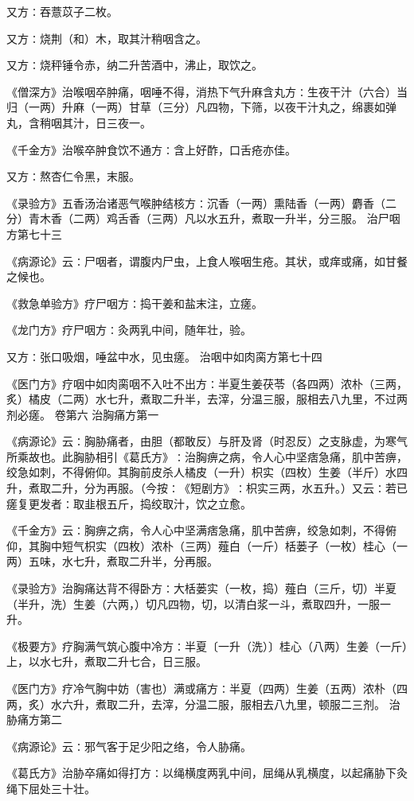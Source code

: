 \documentclass[a4paper,12pt,UTF8,twoside]{ctexbook}
\begin{document}
又方∶吞薏苡子二枚。

又方∶烧荆（和）木，取其汁稍咽含之。

又方∶烧秤锤令赤，纳二升苦酒中，沸止，取饮之。

《僧深方》治喉咽卒肿痛，咽唾不得，消热下气升麻含丸方∶生夜干汁（六合）当归（一两）升麻（一两）甘草（三分）凡四物，下筛，以夜干汁丸之，绵裹如弹丸，含稍咽其汁，日三夜一。

《千金方》治喉卒肿食饮不通方∶含上好酢，口舌疮亦佳。

又方∶熬杏仁令黑，末服。

《录验方》五香汤治诸恶气喉肿结核方∶沉香（一两）熏陆香（一两）麝香（二分）青木香（二两）鸡舌香（三两）凡以水五升，煮取一升半，分三服。
治尸咽方第七十三

《病源论》云∶尸咽者，谓腹内尸虫，上食人喉咽生疮。其状，或痒或痛，如甘餐之候也。

《救急单验方》疗尸咽方∶捣干姜和盐末注，立瘥。

《龙门方》疗尸咽方∶灸两乳中间，随年壮，验。

又方∶张口吸烟，唾盆中水，见虫瘥。
治咽中如肉脔方第七十四

《医门方》疗咽中如肉脔咽不入吐不出方∶半夏生姜茯苓（各四两）浓朴（三两，炙）橘皮（二两）水七升，煮取二升半，去滓，分温三服，服相去八九里，不过两剂必瘥。
卷第六
治胸痛方第一

《病源论》云∶胸胁痛者，由胆（都敢反）与肝及肾（时忍反）之支脉虚，为寒气所乘故也。此胸胁相引《葛氏方》∶治胸痹之病，令人心中坚痞急痛，肌中苦痹，绞急如刺，不得俯仰。其胸前皮杀人橘皮（一升）枳实（四枚）生姜（半斤）水四升，煮取二升，分为再服。（今按∶《短剧方》∶枳实三两，水五升。）又云∶若已瘥复更发者∶取韭根五斤，捣绞取汁，饮之立愈。

《千金方》云∶胸痹之病，令人心中坚满痞急痛，肌中苦痹，绞急如刺，不得俯仰，其胸中短气枳实（四枚）浓朴（三两）薤白（一斤）栝蒌子（一枚）桂心（一两）五味，水七升，煮取二升半，分再服。

《录验方》治胸痛达背不得卧方∶大栝蒌实（一枚，捣）薤白（三斤，切）半夏（半升，洗）生姜（六两，）切凡四物，切，以清白浆一斗，煮取四升，一服一升。

《极要方》疗胸满气筑心腹中冷方∶半夏〔一升（洗）〕桂心（八两）生姜（一斤）上，以水七升，煮取二升七合，日三服。

《医门方》疗冷气胸中妨（害也）满或痛方∶半夏（四两）生姜（五两）浓朴（四两，炙）水六升，煮取二升，去滓，分温二服，服相去八九里，顿服二三剂。
治胁痛方第二

《病源论》云∶邪气客于足少阳之络，令人胁痛。

《葛氏方》治胁卒痛如得打方∶以绳横度两乳中间，屈绳从乳横度，以起痛胁下灸绳下屈处三十壮。
\end{document}

